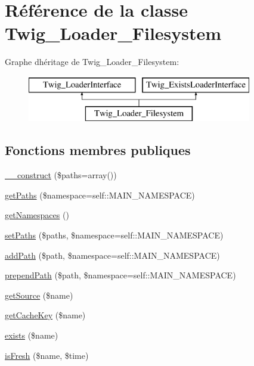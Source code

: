 \hypertarget{class_twig___loader___filesystem}{}\section{Référence de la classe Twig\+\_\+\+Loader\+\_\+\+Filesystem}
\label{class_twig___loader___filesystem}
Graphe d\textquotesingle{}héritage de Twig\+\_\+\+Loader\+\_\+\+Filesystem\+:\begin{figure}[H]
\begin{center}
\leavevmode
\includegraphics[height=2.000000cm]{class_twig___loader___filesystem}
\end{center}
\end{figure}
\subsection*{Fonctions membres publiques}
\begin{DoxyCompactItemize}
\item 
\hyperlink{class_twig___loader___filesystem_a83e29a1e62ec06af26802d3ed070ffc3}{\+\_\+\+\_\+construct} (\$paths=array())
\item 
\hyperlink{class_twig___loader___filesystem_a8521d3d613a29e60cc1bfdf4b85bba75}{get\+Paths} (\$namespace=self\+::\+M\+A\+I\+N\+\_\+\+N\+A\+M\+E\+S\+P\+A\+CE)
\item 
\hyperlink{class_twig___loader___filesystem_ae4c74dabb3e9ba4103ffd4e8febcac21}{get\+Namespaces} ()
\item 
\hyperlink{class_twig___loader___filesystem_a7e388aa6a6e5cce6b57ff23c154860b1}{set\+Paths} (\$paths, \$namespace=self\+::\+M\+A\+I\+N\+\_\+\+N\+A\+M\+E\+S\+P\+A\+CE)
\item 
\hyperlink{class_twig___loader___filesystem_a758f4df0ca7ea3ac2802742ac202951f}{add\+Path} (\$path, \$namespace=self\+::\+M\+A\+I\+N\+\_\+\+N\+A\+M\+E\+S\+P\+A\+CE)
\item 
\hyperlink{class_twig___loader___filesystem_a22161c5fd7e03e040c8f0aaa493f6867}{prepend\+Path} (\$path, \$namespace=self\+::\+M\+A\+I\+N\+\_\+\+N\+A\+M\+E\+S\+P\+A\+CE)
\item 
\hyperlink{class_twig___loader___filesystem_a8c6017d8ed0800a8d6b201883fcfb4bd}{get\+Source} (\$name)
\item 
\hyperlink{class_twig___loader___filesystem_aaf1587bcc7c8f06e87be6ccaf76fb6ea}{get\+Cache\+Key} (\$name)
\item 
\hyperlink{class_twig___loader___filesystem_a0909de156d39accf2e3c52f4bce3765f}{exists} (\$name)
\item 
\hyperlink{class_twig___loader___filesystem_a3ee0419b212dc4f6f1e8a5a615423ad8}{is\+Fresh} (\$name, \$time)
\end{DoxyCompactItemize}
